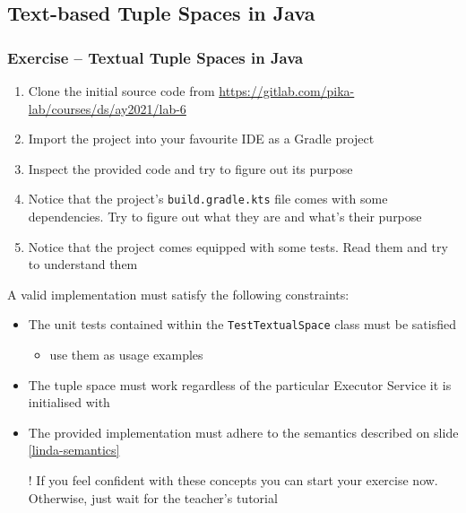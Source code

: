 \documentclass[presentation]{beamer}\mode<presentation>{\usetheme{AMSCesenaPurpleAndGold}}
\newcommand{\labN}{6}
\newcommand{\labGroup}{https://gitlab.com/pika-lab/courses/ds/ay2021}
\newcommand{\labRepo}{\labGroup/lab-\labN}
\begin{document}
\startExercise

\subsection{Text-based Tuple Spaces in Java} 

\begin{frame}[allowframebreaks]
\frametitle{Exercise \currentExercise{} -- Textual Tuple Spaces in Java}

\begin{enumerate}
	\item Clone the initial source code from \url{\labRepo}
	
	\medskip
	
	\item Import the project into your favourite IDE as a Gradle project
	
	\medskip
	
	\item Inspect the provided code and try to figure out its purpose
	
	\medskip
	
	\item Notice that the project's \texttt{build.gradle.kts} file comes with some dependencies.
	Try to figure out what they are and what's their purpose
	
	\medskip
	
	\item Notice that the project comes equipped with some tests. 
	Read them and try to understand them
\end{enumerate}



\framebreak

A valid implementation must satisfy the following constraints:
%
\bigskip
%
\begin{itemize}
	
	\item The \alert{unit tests} contained within the \alert{\texttt{TestTextualSpace}} class must be satisfied
	\begin{itemize}
		\item use them as usage examples
	\end{itemize}

	\bigskip
	
	\item The tuple space must work regardless of the particular Executor Service it is initialised with
	
	\bigskip
	
	\item The provided implementation must adhere to the \alert{\linda{} semantics} described on slide \ref{linda-semantics}
	
	\bigskip
	
	\item[!] If you feel confident with these concepts you can start your exercise now. 
	Otherwise, just wait for the teacher's tutorial
\end{itemize}
\end{frame}
\end{document}
